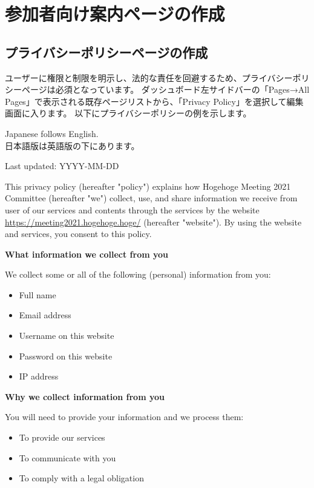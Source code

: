 \documentclass[titlepage,10pt,a4paper,uplatex]{jsbook}
\newenvironment{content}{\begin{shaded}\vspace{-1em}\raggedright\ttfamily\footnotesize\setlength{\baselineskip}{1.4em}}{\end{shaded}\vspace{-1em}}
\renewcommand{\textbf}[1]{{\bfseries\sffamily#1}}
\begin{document}
\section{参加者向け案内ページの作成}

\subsection{プライバシーポリシーページの作成}

ユーザーに権限と制限を明示し、法的な責任を回避するため、プライバシーポリシーページは必須となっています。
ダッシュボード左サイドバーの「Pages→All Pages」で表示される既存ページリストから、「Privacy Policy」を選択して編集画面に入ります。
以下にプライバシーポリシーの例を示します。

\begin{content}
Japanese follows English.\\
日本語版は英語版の下にあります。

Last updated: YYYY-MM-DD

This privacy policy (hereafter "policy") explains how Hogehoge Meeting 2021 Committee (hereafter "we") collect, use, and share information we receive from user of our services and contents through the services by the website \url{https://meeting2021.hogehoge.hoge/} (hereafter "website"). By using the website and services, you consent to this policy.

\textbf{\Large What information we collect from you}

We collect some or all of the following (personal) information from you:

\begin{itemize}
\item Full name
\item Email address
\item Username on this website
\item Password on this website
\item IP address
\end{itemize}

\textbf{\Large Why we collect information from you}

You will need to provide your information and we process them:

\begin{itemize}
\item To provide our services
\item To communicate with you
\item To comply with a legal obligation
\end{itemize}


\end{content}
\end{document}
